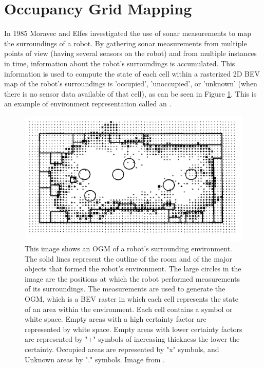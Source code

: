 \section{Occupancy Grid Mapping} \label{sec:ogm}
In 1985 Moravec and Elfes \cite{moravec1985high} investigated the use of sonar measurements to map the surroundings of a robot. By gathering sonar measurements from multiple points of view (having several sensors on the robot) and from multiple instances in time, information about the robot's surroundings is accumulated. This information is used to compute the state of each cell within a rasterized 2D \gls{BEV} map of the robot's surroundings is 'occupied', 'unoccupied', or 'unknown' (when there is no sensor data available of that cell), as can be seen in Figure \ref{fig:OGMBEVmoravec}. This is an example of environment representation called an . \\

\begin{figure}[h]
	\centering
	\includegraphics[width=0.6\linewidth]{Figures/Occupancy_Grid_Map/The_Two-dimensional_Sonar_map}
	\caption{This image shows an \gls{OGM} of a robot's surrounding environment. The solid lines represent the outline of the room and of the major objects that formed the robot's environment. The large circles in the image are the positions at which the robot performed measurements of its surroundings. The measurements are used to generate the \gls{OGM}, which is a \gls{BEV} raster in which each cell represents the state of an area within the environment. Each cell contains a symbol or white space. Empty areas with a high certainty factor are represented by white space. Empty areas with lower certainty factors are represented by "+" symbols of increasing thickness the lower the certainty. Occupied areas are represented by "x" symbols, and Unknown areas by "." symbols. Image from \cite{moravec1985high}.}
	\label{fig:OGMBEVmoravec}
\end{figure}

